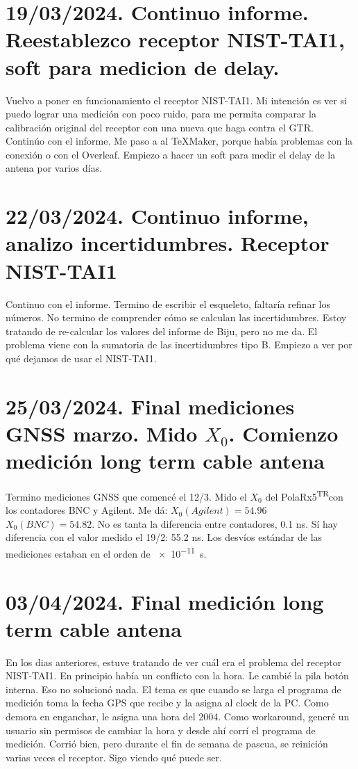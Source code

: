 \documentclass[11pt]{article}
\newcommand{\polar}[0]{PolaRx5\textsuperscript{TR}}
\begin{document}
\section{19/03/2024. Continuo informe. Reestablezco receptor NIST-TAI1, soft para medicion de delay.}

Vuelvo a poner en funcionamiento el receptor NIST-TAI1. Mi intención es ver si puedo lograr una medición con poco ruido, para me permita comparar la calibración original del receptor con una nueva que haga contra el GTR. Continúo con el informe. Me paso a al TeXMaker, porque había problemas con la conexión o con el Overleaf. Empiezo a hacer un soft para medir el delay de la antena por varios días.

\section{22/03/2024. Continuo informe, analizo incertidumbres. Receptor NIST-TAI1}
Continuo con el informe. Termino de escribir el esqueleto, faltaría refinar los números. No termino de comprender cómo se calculan las incertidumbres. Estoy tratando de re-calcular los valores del informe de Biju, pero no me da. El problema viene con la sumatoria de las incertidumbres tipo B. Empiezo a ver por qué dejamos de usar el NIST-TAI1.

\section{25/03/2024. Final mediciones GNSS marzo. Mido $X_0$. Comienzo  medición long term cable antena}

Termino mediciones GNSS que comencé el 12/3. Mido el $X_0$ del \polar con los contadores BNC y Agilent. Me dá: $X_0 (Agilent) = 54.96$ $X_0 (BNC) = 54.82$. No es tanta la diferencia entre contadores, 0.1 ns. Sí hay diferencia con el valor medido el 19/2: 55.2 ns. Los desvíos estándar de las mediciones estaban en el orden de \SI{e-11}{\second}.

\section{03/04/2024. Final medición long term cable antena}
En los dias anteriores, estuve tratando de ver cuál era el problema del receptor NIST-TAI1. En principio había un conflicto con la hora. Le cambié la pila botón interna. Eso no solucionó nada. El tema es que cuando se larga el programa de medición toma la fecha GPS que recibe y la asigna al clock de la PC. Como demora en enganchar, le asigna una hora del 2004. Como workaround, generé un usuario sin permisos de cambiar la hora y desde ahí corrí el programa de medición. Corrió bien, pero durante el fin de semana de pascua, se reinición varias veces el receptor. Sigo viendo qué puede ser.
\end{document}
